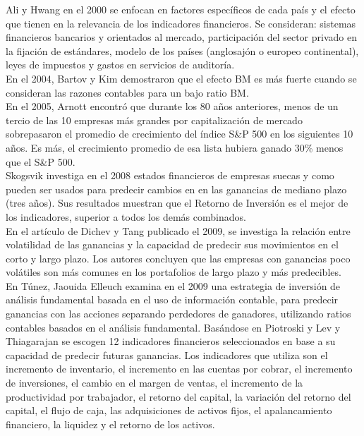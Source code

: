 Ali y Hwang \cite{Ali2000} en el 2000 se enfocan en factores específicos de cada país y el efecto que tienen en la relevancia de los indicadores financieros. Se consideran: sistemas financieros bancarios y orientados al mercado, participación del sector privado en la fijación de estándares, modelo de los países (anglosajón o europeo continental), leyes de impuestos y gastos en servicios de auditoría.\\

En el 2004, Bartov y Kim \cite{Bartov2004} demostraron que el efecto BM es más fuerte cuando se consideran las razones contables para un bajo ratio BM.\\

En el 2005, Arnott \cite{Arnott2005} encontró que durante los 80 años anteriores, menos de un tercio de las 10 empresas más grandes por capitalización de mercado sobrepasaron el promedio de crecimiento del índice S\&P 500 en los siguientes 10 años. Es más, el crecimiento promedio de esa lista hubiera ganado 30\% menos que el S\&P 500.\\

Skogsvik \cite{Skogsvik2008} investiga en el 2008 estados financieros de empresas suecas y como pueden ser usados para predecir cambios en en las ganancias de mediano plazo (tres años). Sus resultados muestran que el Retorno de Inversión es el mejor de los indicadores, superior a todos los demás combinados.\\

En el artículo de Dichev y Tang \cite{Dichev2009} publicado el 2009, se investiga la relación entre volatilidad de las ganancias y la capacidad de predecir sus movimientos en el corto y largo plazo. Los autores concluyen que las empresas con ganancias poco volátiles son más comunes en los portafolios de largo plazo y más predecibles.\\

En Túnez, Jaouida Elleuch \cite{Elleuch2009} examina en el 2009 una estrategia de inversión de análisis fundamental  basada en el uso de información contable, para predecir ganancias con las acciones separando perdedores de ganadores, utilizando ratios contables basados en el análisis fundamental. Basándose en Piotroski \cite{Piotroski2000} y Lev y Thiagarajan \cite{Lev1993} se escogen 12 indicadores  financieros seleccionados en base a su capacidad de predecir futuras ganancias. Los indicadores que utiliza son el incremento de inventario, el incremento en las cuentas por cobrar, el incremento de inversiones, el cambio en el margen de ventas, el incremento de la productividad por trabajador, el retorno del capital, la variación del retorno del capital, el flujo de caja, las adquisiciones de activos fijos, el apalancamiento financiero, la liquidez y el retorno de los activos.\\

